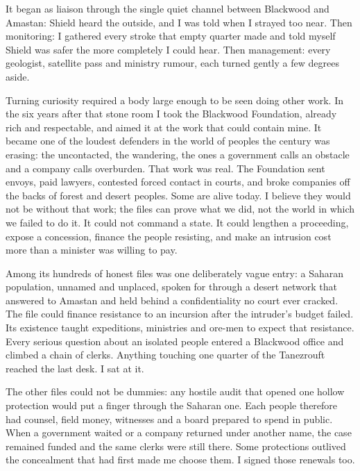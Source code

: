 It began as liaison through the single quiet channel between Blackwood and Amastan: Shield heard the outside, and I was told when I strayed too near. Then monitoring: I gathered every stroke that empty quarter made and told myself Shield was safer the more completely I could hear. Then management: every geologist, satellite pass and ministry rumour, each turned gently a few degrees aside.\par

Turning curiosity required a body large enough to be seen doing other work. In the six years after that stone room I took the Blackwood Foundation, already rich and respectable, and aimed it at the work that could contain mine. It became one of the loudest defenders in the world of peoples the century was erasing: the uncontacted, the wandering, the ones a government calls an obstacle and a company calls overburden. That work was real. The Foundation sent envoys, paid lawyers, contested forced contact in courts, and broke companies off the backs of forest and desert peoples. Some are alive today. I believe they would not be without that work; the files can prove what we did, not the world in which we failed to do it. It could not command a state. It could lengthen a proceeding, expose a concession, finance the people resisting, and make an intrusion cost more than a minister was willing to pay.\par

Among its hundreds of honest files was one deliberately vague entry: a Saharan population, unnamed and unplaced, spoken for through a desert network that answered to Amastan and held behind a confidentiality no court ever cracked. The file could finance resistance to an incursion after the intruder's budget failed. Its existence taught expeditions, ministries and ore-men to expect that resistance. Every serious question about an isolated people entered a Blackwood office and climbed a chain of clerks. Anything touching one quarter of the Tanezrouft reached the last desk. I sat at it.\par

The other files could not be dummies: any hostile audit that opened one hollow protection would put a finger through the Saharan one. Each people therefore had counsel, field money, witnesses and a board prepared to spend in public. When a government waited or a company returned under another name, the case remained funded and the same clerks were still there. Some protections outlived the concealment that had first made me choose them. I signed those renewals too.\par

